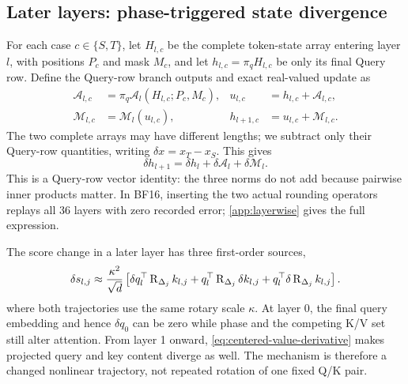 \subsection{Later layers: phase-triggered state divergence}

For each case $c\in\{S,T\}$, let $H_{l,c}$ be the complete token-state array
entering layer $l$, with positions $P_c$ and mask $M_c$, and let
$h_{l,c}=\pi_qH_{l,c}$ be only its final Query row.  Define the Query-row branch
outputs and exact real-valued update as
\begin{align}
  \mathcal A_{l,c}&=\pi_q\mathcal A_l(H_{l,c};P_c,M_c),&
  u_{l,c}&=h_{l,c}+\mathcal A_{l,c},\\
  \mathcal M_{l,c}&=\mathcal M_l(u_{l,c}),&
  h_{l+1,c}&=u_{l,c}+\mathcal M_{l,c}.
\end{align}
The two complete arrays may have different lengths; we subtract only their
Query-row quantities, writing $\delta x=x_T-x_S$.  This gives
\begin{equation}
  \delta h_{l+1}
  =\delta h_l+\delta\mathcal A_l+\delta\mathcal M_l.
  \label{eq:layer-difference}
\end{equation}
This is a Query-row vector identity: the three norms do not add because pairwise
inner products matter.  In BF16, inserting the two actual rounding operators replays
all 36 layers with zero recorded error; \cref{app:layerwise} gives the full
expression.

The score change in a later layer has three first-order sources,
\begin{equation}
  \delta s_{l,j}\approx\frac{\kappa^2}{\sqrt d}\left[
  \delta q_l^\top\operatorname{R}_{\Delta_j}k_{l,j}
  +q_l^\top\operatorname{R}_{\Delta_j}\delta k_{l,j}
  +q_l^\top\delta\operatorname{R}_{\Delta_j}k_{l,j}
  \right].
  \label{eq:three-score-sources}
\end{equation}
where both trajectories use the same rotary scale $\kappa$.
At layer 0, the final query embedding and hence $\delta q_0$ can be zero while
phase and the competing K/V set still alter attention.  From layer 1 onward,
\cref{eq:centered-value-derivative} makes projected query and key content
diverge as well.  The mechanism is therefore a changed nonlinear trajectory,
not repeated rotation of one fixed Q/K pair.

